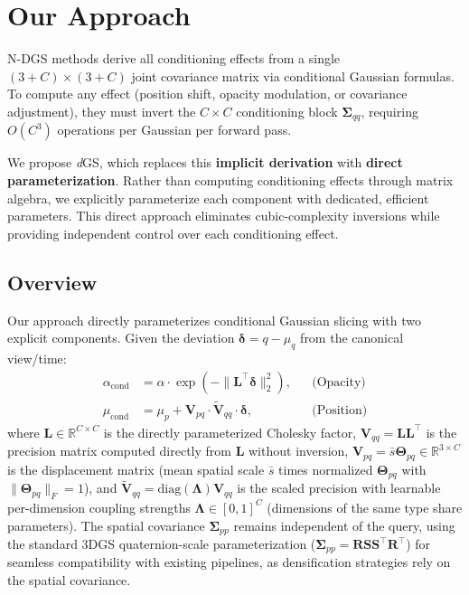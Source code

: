 \documentclass{article}
\newcommand{\modelname}{\textit{d}GS}
\theoremstyle{plain}
\theoremstyle{definition}
\theoremstyle{remark}
\begin{document}
\section{Our Approach}

N-DGS methods derive all conditioning effects from a single $(3+C) \times (3+C)$ joint covariance matrix via conditional Gaussian formulas. To compute any effect (position shift, opacity modulation, or covariance adjustment), they must invert the $C \times C$ conditioning block $\boldsymbol{\Sigma}_{qq}$, requiring $O(C^3)$ operations per Gaussian per forward pass.

We propose \modelname{}, which replaces this \textbf{implicit derivation} with \textbf{direct parameterization}. Rather than computing conditioning effects through matrix algebra, we explicitly parameterize each component with dedicated, efficient parameters. This direct approach eliminates cubic-complexity inversions while providing independent control over each conditioning effect.

\subsection{Overview}

Our approach directly parameterizes conditional Gaussian slicing with two explicit components. Given the deviation $\boldsymbol{\delta} = q - \mu_q$ from the canonical view/time:
\begin{align}
\alpha_{\text{cond}} &= \alpha \cdot \exp\left(-\|\mathbf{L}^\top \boldsymbol{\delta}\|_2^2\right), & &\text{(Opacity)} \\
\mu_{\text{cond}} &= \mu_p + \mathbf{V}_{pq} \cdot \tilde{\mathbf{V}}_{qq} \cdot \boldsymbol{\delta}, & &\text{(Position)} \end{align}
where $\mathbf{L} \in \mathbb{R}^{C \times C}$ is the directly parameterized Cholesky factor, $\mathbf{V}_{qq} = \mathbf{L}\mathbf{L}^\top$ is the precision matrix computed directly from $\mathbf{L}$ without inversion, $\mathbf{V}_{pq} = \bar{s}\boldsymbol{\Theta}_{pq} \in \mathbb{R}^{3 \times C}$ is the displacement matrix (mean spatial scale $\bar{s}$ times normalized $\boldsymbol{\Theta}_{pq}$ with $\|\boldsymbol{\Theta}_{pq}\|_F = 1$), and $\tilde{\mathbf{V}}_{qq} = \text{diag}(\boldsymbol{\Lambda}) \mathbf{V}_{qq}$ is the scaled precision with learnable per-dimension coupling strengths $\boldsymbol{\Lambda} \in [0,1]^C$ (dimensions of the same type share parameters). The spatial covariance $\boldsymbol{\Sigma}_{pp}$ remains independent of the query, using the standard 3DGS quaternion-scale parameterization ($\boldsymbol{\Sigma}_{pp} = \mathbf{R}\mathbf{S}\mathbf{S}^\top \mathbf{R}^\top$) for seamless compatibility with existing pipelines, as densification strategies rely on the spatial covariance.
\end{document}
